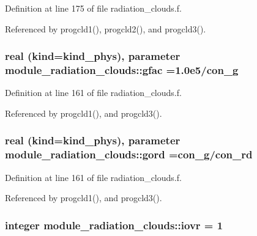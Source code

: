 Definition at line 175 of file radiation\+\_\+clouds.\+f.



Referenced by progcld1(), progcld2(), and progcld3().

\subsubsection[{\texorpdfstring{gfac}{gfac}}]{\setlength{\rightskip}{0pt plus 5cm}real (kind=kind\+\_\+phys), parameter module\+\_\+radiation\+\_\+clouds\+::gfac =1.\+0e5/con\+\_\+g\hspace{0.3cm}{\ttfamily [private]}}\hypertarget{namespacemodule__radiation__clouds_ab4060544be25be2b0a87042fb3bd6242}{}\label{namespacemodule__radiation__clouds_ab4060544be25be2b0a87042fb3bd6242}


Definition at line 161 of file radiation\+\_\+clouds.\+f.



Referenced by progcld1(), and progcld3().

\subsubsection[{\texorpdfstring{gord}{gord}}]{\setlength{\rightskip}{0pt plus 5cm}real (kind=kind\+\_\+phys), parameter module\+\_\+radiation\+\_\+clouds\+::gord =con\+\_\+g/con\+\_\+rd\hspace{0.3cm}{\ttfamily [private]}}\hypertarget{namespacemodule__radiation__clouds_a50ea21222eb91e6363e8bf1338b34a66}{}\label{namespacemodule__radiation__clouds_a50ea21222eb91e6363e8bf1338b34a66}


Definition at line 161 of file radiation\+\_\+clouds.\+f.



Referenced by progcld1(), and progcld3().

\subsubsection[{\texorpdfstring{iovr}{iovr}}]{\setlength{\rightskip}{0pt plus 5cm}integer module\+\_\+radiation\+\_\+clouds\+::iovr = 1\hspace{0.3cm}{\ttfamily [private]}}\hypertarget{namespacemodule__radiation__clouds_a5cfafee79e8cf066ddd8440cdfdc41a0}{}\label{namespacemodule__radiation__clouds_a5cfafee79e8cf066ddd8440cdfdc41a0}


